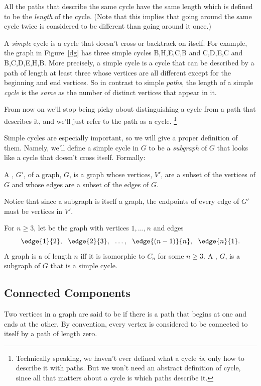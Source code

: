 All the paths that describe the same cycle have the same length which is
defined to be the {\em length} of the cycle.  (Note that this implies that
going around the same cycle twice is considered to be different than going
around it once.)

A \emph{simple} cycle is a cycle that doesn't cross or
backtrack on itself.  For example, the graph in Figure~\ref{dg} has three
simple cycles B,H,E,C,B and C,D,E,C and B,C,D,E,H,B.  More precisely, a
simple cycle is a cycle that can be described by a path of length at least
three whose vertices are all different except for the beginning and end
vertices.  So in contrast to simple \emph{paths}, the length of a simple
\emph{cycle} is the \emph{same} as the number of distinct vertices that
appear in it.

From now on we'll stop being picky about distinguishing a cycle from a
path that describes it, and we'll just refer to the path as a cycle.
\footnote{Technically speaking, we haven't ever defined what a cycle
\emph{is}, only how to describe it with paths.  But we won't need an
abstract definition of cycle, since all that matters about a cycle is which
paths describe it.}

Simple cycles are especially important, so we will give a proper
definition of them.  Namely, we'll define a simple cycle in $G$ to be a
\emph{subgraph} of $G$ that looks like a cycle that doesn't cross itself.
Formally:
\begin{definition}
A , $G'$, of a graph, $G$, is a graph whose vertices, $V'$,
are a subset of the vertices of $G$ and whose edges are a subset
of the edges of $G$.
\end{definition}
Notice that since a subgraph is itself a graph, the endpoints of every
edge of $G'$ must be vertices in $V'$.
\begin{definition}
  For $n \ge 3$, let  be the graph with vertices $1,\dots, n$
  and edges
\[
\edge{1}{2},\ \ \edge{2}{3},\ \ \dots,\ \ \edge{(n-1)}{n},\ \ \edge{n}{1}.
\]
A graph is a  of length $n$ iff it is isomorphic to $C_n$
for some $n \ge 3$.  A , $G$, is a subgraph
of $G$ that is a simple cycle.
\end{definition}

\subsection{Connected Components}
\begin{definition}
  Two vertices in a graph are said to be  if there is a
  path that begins at one and ends at the other.  By convention, every
  vertex is considered to be connected to itself by a path of length zero.
\end{definition}

